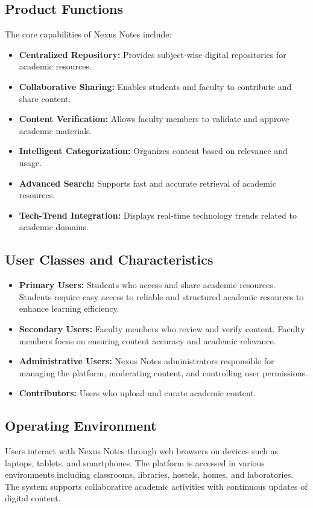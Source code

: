 \documentclass[12pt]{article}
\begin{document}
\subsection{Product Functions}
The core capabilities of Nexus Notes include:
\begin{itemize}
    \item \textbf{Centralized Repository:} Provides subject-wise digital repositories for academic resources.
    \item \textbf{Collaborative Sharing:} Enables students and faculty to contribute and share content.
    \item \textbf{Content Verification:} Allows faculty members to validate and approve academic materials.
    \item \textbf{Intelligent Categorization:} Organizes content based on relevance and usage.
    \item \textbf{Advanced Search:} Supports fast and accurate retrieval of academic resources.
    \item \textbf{Tech-Trend Integration:} Displays real-time technology trends related to academic domains.
\end{itemize}

\subsection{User Classes and Characteristics}

\begin{itemize}
    \item \textbf{Primary Users:} Students who access and share academic resources. Students require easy access to reliable and structured academic resources to enhance learning efficiency.

    \item \textbf{Secondary Users:} Faculty members who review and verify content. Faculty members focus on ensuring content accuracy and academic relevance.

    \item \textbf{Administrative Users:} Nexus Notes administrators responsible for managing the platform, moderating content, and controlling user permissions.

    \item \textbf{Contributors:} Users who upload and curate academic content.
\end{itemize}

\subsection{Operating Environment}
Users interact with Nexus Notes through web browsers on devices such as laptops, tablets, and smartphones.
The platform is accessed in various environments including classrooms, libraries, hostels, homes, and laboratories.
The system supports collaborative academic activities with continuous updates of digital content.
\end{document}
